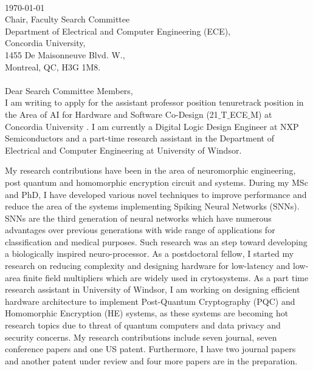 \documentclass[12pt,oneside]{book}
\begin{document}
\thispagestyle{empty}
\vspace*{-5em} \phantom \quad \\
\today\\
Chair, Faculty Search Committee\\
Department of Electrical and Computer Engineering (ECE),\\
Concordia University,\\
1455 De Maisonneuve Blvd. W.,\\
Montreal, QC, H3G 1M8.\\
\phantom \quad \\
Dear Search Committee Members,\\

I am writing to apply for the assistant professor position tenuretrack position in the Area of AI for Hardware and Software Co-Design  (21$\_$T$\_$ECE$\_$M)  at Concordia University . I am currently a Digital Logic Design Engineer at NXP Semiconductors and a
 part-time research assistant in the Department of Electrical and Computer Engineering at University of Windsor.

My research contributions have been in the area of neuromorphic engineering, post quantum and homomorphic encryption circuit and systems.  
 During my MSc and PhD, I  have developed various novel techniques to improve performance  and  reduce the area of the systems implementing Spiking Neural Networks (SNNs). SNNs are the third generation of neural networks which have numerous advantages over previous generations with wide range of applications  for classification and medical purposes. Such research was an step toward developing a biologically inspired neuro-processor.   As a postdoctoral fellow, I  started my research  on reducing  complexity and designing hardware for low-latency and low-area finite field  multipliers which are widely used in crytosystems.
As a part time research assistant in University of Windsor, I am working on designing efficient hardware architecture to implement Post-Quantum Cryptography (PQC) and Homomorphic  Encryption (HE) systems, as these systems are becoming  hot research topics due to threat of  quantum computers and data privacy and security concerns.  My research contributions  include seven journal, seven conference papers and one US patent. Furthermore, I have two journal papers and another patent under review and four more papers are in the preparation.
\end{document}
